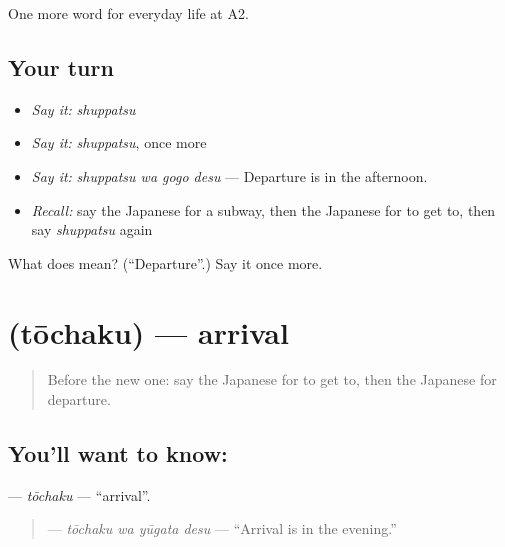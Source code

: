\begin{grammarlens}[title={What you've built}]
One more word for everyday life at A2.
\end{grammarlens}

\subsection*{Your turn}
\begin{itemize}
\raggedright
  \item \emph{Say it:} \emph{shuppatsu}
  \item \emph{Say it:} \emph{shuppatsu}, once more
  \item \emph{Say it:} \emph{shuppatsu wa gogo desu} — Departure is in the afternoon.
  \item \emph{Recall:} say the Japanese for a subway, then the Japanese for to get to, then say \emph{shuppatsu} again
\end{itemize}

\begin{tcolorbox}[breakable,colback=teal!4,colframe=teal!35!black,title={Before you move on}]
What does  mean? (\textquotedblleft{}Departure\textquotedblright{}.) Say it once more.
\end{tcolorbox}
\section[\texorpdfstring{\ja{とうちゃく} (tōchaku)}{とうちゃく (tōchaku)}]{ (tōchaku) — arrival}

\label{lesson:JA-C199-touchaku}



\begin{quote}
Before the new one: say the Japanese for to get to, then the Japanese for departure.
\end{quote}

\subsection*{You'll want to know: }
\textbf{} — \emph{tōchaku} — \textquotedblleft{}arrival\textquotedblright{}.

\begin{quote}
\textbf{ } — \emph{tōchaku wa yūgata desu} — \textquotedblleft{}Arrival is in the evening.\textquotedblright{}
\end{quote}

